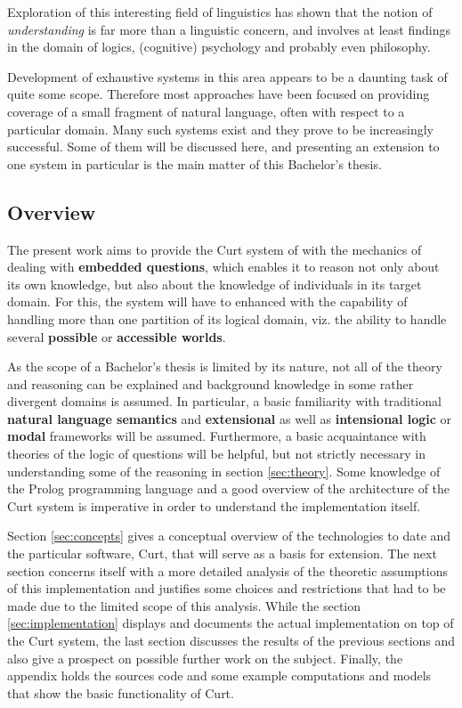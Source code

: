 \documentclass[notitlepage,twoside,a4paper]{scrreprt}
\newcommand{\term}[1]{\textsf{\textbf{#1}}} %
\newcommand{\pn}{\textsf} %
\newcommand{\curt}{\pn{Curt}}
\newcommand{\prol}{\pn{Prolog}}
\theoremstyle{remark}
\theoremstyle{remark}
\theoremstyle{definition}
\theoremstyle{definition}
\begin{document}
Exploration of this  interesting field of linguistics has shown that
the notion of \emph{understanding} is far more than a linguistic concern, and
involves at least findings in the domain of logics, (cognitive) psychology and
probably even philosophy.

Development of exhaustive systems in this area appears to be a daunting task of
quite some scope. Therefore most approaches have been focused on providing
coverage of a small fragment of natural language, often with respect to a
particular domain. Many such systems exist and they prove to be increasingly
successful. Some of them will be discussed here, and presenting an extension to
one system in particular is the main matter of this Bachelor's thesis.

\subsection{Overview}

The present work aims to provide the \curt{} system of
\cite{blackburnbos:cl1} with the mechanics of dealing with \term{embedded
questions}, which enables it to reason not only about its own knowledge, but
also about the knowledge of individuals in its target domain.
For this, the system will have to enhanced with the capability of handling more
than one partition of its logical domain, viz. the ability to handle several
\term{possible} or \term{accessible worlds}.

As the scope of a Bachelor's thesis is limited by its nature, not all of the
theory and reasoning can be explained and background knowledge in some rather
divergent domains is assumed. In particular, a basic familiarity with
traditional \term{natural language semantics} and \term{extensional} as well as
\term{intensional logic} or \term{modal} frameworks will be assumed.
Furthermore, a basic acquaintance with theories of the logic of questions will be helpful,
but not strictly necessary in understanding some of the reasoning in section
\ref{sec:theory}.  Some knowledge of the \prol{} programming language and a good
overview of the architecture of the \curt{} system is imperative in order to
understand the implementation itself.

Section \ref{sec:concepts}  gives a conceptual overview of the technologies to
date and the particular software, \curt, that will serve as a basis for
extension.  The next section concerns itself with a more detailed analysis of
the theoretic assumptions of this implementation and justifies some choices and
restrictions that had to be made due to the limited scope of this analysis.
While the section \ref{sec:implementation} displays and documents the actual
implementation on top of the \curt{} system, the last section discusses the
results of the previous sections and also give a prospect on possible further work on the
subject. Finally, the appendix holds the sources code and some example
computations and models that show the basic functionality of \curt.
\end{document}
